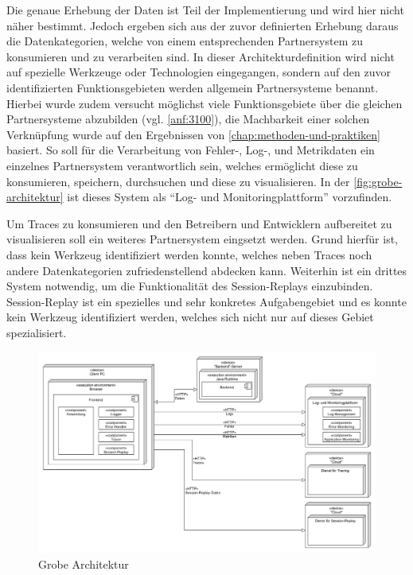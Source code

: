 	 Die genaue Erhebung der Daten ist Teil der Implementierung und wird hier nicht näher bestimmt. Jedoch ergeben sich aus der zuvor definierten Erhebung daraus die Datenkategorien, welche von einem entsprechenden Partnersystem zu konsumieren und zu verarbeiten sind. In dieser Architekturdefinition wird nicht auf spezielle Werkzeuge oder Technologien eingegangen, sondern auf den zuvor identifizierten Funktionsgebieten werden allgemein Partnersysteme benannt. Hierbei wurde zudem versucht möglichst viele Funktionsgebiete über die gleichen Partnersysteme abzubilden (vgl. \autoref{anf:3100}), die Machbarkeit einer solchen Verknüpfung wurde auf den Ergebnissen von \autoref{chap:methoden-und-praktiken} basiert. So soll für die Verarbeitung von Fehler-, Log-, und Metrikdaten ein einzelnes Partnersystem verantwortlich sein, welches ermöglicht diese zu konsumieren, speichern, durchsuchen und diese zu visualisieren. In der \autoref{fig:grobe-architektur} ist dieses System als \enquote{Log- und Monitoringplattform} vorzufinden.
	
	Um Traces zu konsumieren und den Betreibern und Entwicklern aufbereitet zu visualisieren soll ein weiteres Partnersystem eingsetzt werden. Grund hierfür ist, dass kein Werkzeug identifiziert werden konnte, welches neben Traces noch andere Datenkategorien zufriedenstellend abdecken kann. Weiterhin ist ein drittes System notwendig, um die Funktionalität des Session-Replays einzubinden. Session-Replay ist ein spezielles und sehr konkretes Aufgabengebiet und es konnte kein Werkzeug identifiziert werden, welches sich nicht nur auf dieses Gebiet spezialisiert.
	
\begin{figure}[H]
	\centering
	\includegraphics[width=0.65\linewidth]{img/04_erstellung-poc/konzept-simple.png}
	\caption{Grobe Architektur}
	\label{fig:grobe-architektur}
\end{figure}

